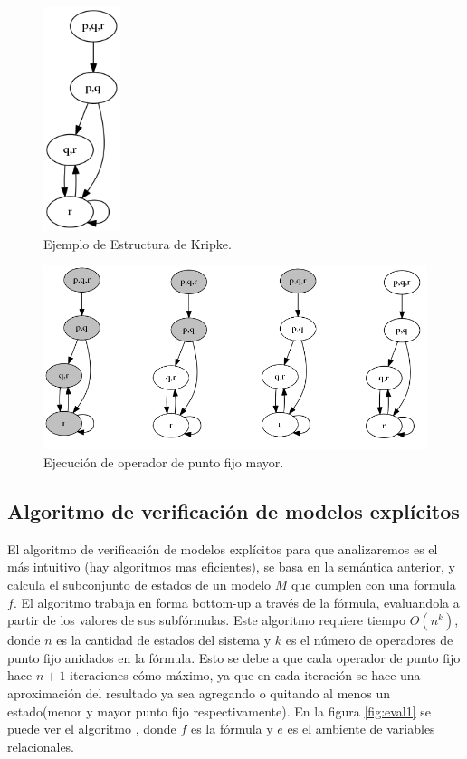 \begin{figure}[h!]
  \centering
  \includegraphics[width=0.2\textwidth]{Figures/kripke3.png}
  \caption{Ejemplo de Estructura de Kripke.} 
  \label{fig:kripke3}
\end{figure}
\begin{figure}[H]
  \centering
  \includegraphics[width=1\textwidth]{Figures/kripke3-gfp1.png}
  \caption{Ejecución de operador de punto fijo mayor.} 
  \label{fig:kripke3-gfp1}
\end{figure}

\subsection{Algoritmo de verificación de modelos explícitos}

El algoritmo de verificación de modelos explícitos para {\mucalculo} que analizaremos es el más intuitivo (hay algoritmos mas eficientes), se basa en la semántica anterior, y calcula el subconjunto de estados de un modelo $M$ que cumplen con una formula $f$. El algoritmo trabaja en forma bottom-up a través de la fórmula, evaluandola a partir de los valores de sus subfórmulas. Este algoritmo requiere tiempo $O(n^{k})$, donde $n$ es la cantidad de estados del sistema y $k$ es el número de operadores de punto fijo anidados en la fórmula. Esto se debe a que cada operador de punto fijo hace $n+1$ iteraciones cómo máximo, ya que en cada iteración se hace una aproximación del resultado ya sea agregando o quitando al menos un estado(menor y mayor punto fijo respectivamente). En la figura \ref{fig:eval1} se puede ver el algoritmo \cite{Clarke:1}, donde $f$ es la fórmula y $e$ es el ambiente de variables relacionales.


